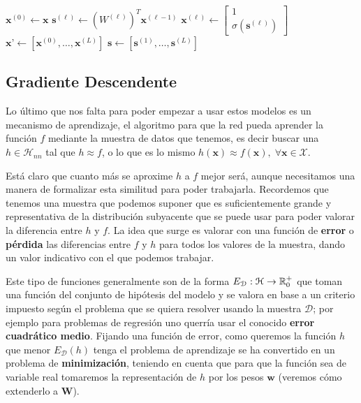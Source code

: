 \begin{algorithm}[htbp]
\SetAlgoLined
 $\textbf{x}^{(0)} \gets \textbf{x}$\;
  {
  $\textbf{s}^{(\ell)} \gets (W^{(\ell)})^T \textbf{x}^{(\ell - 1)}$\;
  $\textbf{x}^{(\ell)} \gets \begin{bmatrix} 1 \\ \sigma(\textbf{s}^{(\ell)})\end{bmatrix}$\;
 }
 $\textbf{x'} \gets \left[\textbf{x}^{(0)}, \ldots, \textbf{x}^{(L)}\right]$\;
 $\textbf{s} \gets \left[\textbf{s}^{(1)}, \ldots, \textbf{s}^{(L)}\right]$\;
 \caption{$ForwardPropagation(\textbf{x})$)}
 \label{alg:fp}
\end{algorithm}

\subsection{Gradiente Descendente}

Lo último que nos falta para poder empezar a usar estos modelos es un mecanismo de aprendizaje, el algoritmo para que la red pueda aprender la función $f$ mediante la muestra de datos que tenemos, es decir buscar una $h \in \mathcal{H}_{nn}$ tal que $h \approx f$, o lo que es lo mismo $h(\textbf{x}) \approx f(\textbf{x}), \; \forall \textbf{x} \in \mathcal{X}$.

Está claro que cuanto más se aproxime $h$ a $f$ mejor será, aunque necesitamos una manera de formalizar esta similitud para poder trabajarla. Recordemos que tenemos una muestra que podemos suponer que es suficientemente grande y representativa de la distribución subyacente que se puede usar para poder valorar la diferencia entre $h$ y $f$. La idea que surge es valorar con una función de \textbf{error} o \textbf{pérdida} las diferencias entre $f$ y $h$ para todos los valores de la muestra, dando un valor indicativo con el que podemos trabajar.

Este tipo de funciones generalmente son de la forma $E_{\mathcal{D}} : \mathcal{H} \to \mathbb{R}^+_0$ que toman una función del conjunto de hipótesis del modelo y se valora en base a un criterio impuesto según el problema que se quiera resolver usando la muestra $\mathcal{D}$; por ejemplo para problemas de regresión uno querría usar el conocido \textbf{error cuadrático medio}. Fijando una función de error, como queremos la función $h$ que menor $E_{\mathcal{D}}(h)$ tenga el problema de aprendizaje se ha convertido en un problema de \textbf{minimización}, teniendo en cuenta que para que la función sea de variable real tomaremos la representación de $h$ por los pesos $\textbf{w}$ (veremos cómo extenderlo a $\textbf{W}$).

